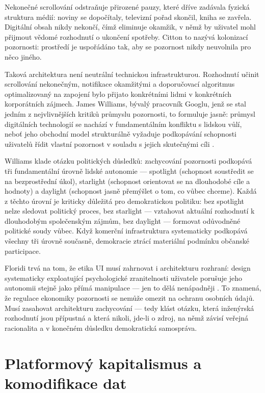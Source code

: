 Nekonečné scrollování odstraňuje přirozené pauzy, které dříve zadávala fyzická struktura médií: noviny se dopočítaly, televizní pořad skončil, kniha se zavřela. Digitální obsah nikdy nekončí, čímž eliminuje okamžik, v němž by uživatel mohl přijmout vědomé rozhodnutí o ukončení spotřeby. Citton to nazývá kolonizací pozornosti: prostředí je uspořádáno tak, aby se pozornost nikdy neuvolnila pro něco jiného.

Taková architektura není neutrální technickou infrastrukturou. Rozhodnutí učinit scrollování nekonečným, notifikace okamžitými a doporučovací algoritmus optimalizovaný na zapojení bylo přijato konkrétními lidmi v konkrétních korporátních zájmech. James Williams, bývalý pracovník Googlu, jenž se stal jedním z nejvlivnějších kritiků průmyslu pozornosti, to formuluje jasně: průmysl digitálních technologií se nachází v fundamentálním konfliktu s lidskou vůlí, neboť jeho obchodní model strukturálně vyžaduje podkopávání schopnosti uživatelů řídit vlastní pozornost v souladu s jejich skutečnými cíli \parencite{Williams18}.

Williams klade otázku politických důsledků: zachycování pozornosti podkopává tři fundamentální úrovně lidské autonomie — spotlight (schopnost soustředit se na bezprostřední úkol), starlight (schopnost orientovat se na dlouhodobé cíle a hodnoty) a daylight (schopnost jasně přemýšlet o tom, co vůbec chceme).
Každá z těchto úrovní je kriticky důležitá pro demokratickou politiku: bez spotlight nelze sledovat politický proces, bez starlight — vztahovat aktuální rozhodnutí k dlouhodobým společenským zájmům, bez daylight — formovat odůvodněné politické soudy vůbec.
Když komerční infrastruktura systematicky podkopává všechny tři úrovně současně, demokracie ztrácí materiální podmínku občanské participace.

Floridi trvá na tom, že etika UI musí zahrnovat i architekturu rozhraní: design systematicky exploatující psychologické zranitelnosti uživatele porušuje jeho autonomii stejně jako přímá manipulace — jen to dělá nenápadněji \parencite{Floridi23}.
To znamená, že regulace ekonomiky pozornosti se nemůže omezit na ochranu osobních údajů.
Musí zasahovat architekturu zachycování — tedy klást otázku, která inženýrská rozhodnutí jsou přípustná a která nikoli, jde-li o zdroj, na němž závisí veřejná racionalita a v konečném důsledku demokratická samospráva.

\section{Platformový kapitalismus a komodifikace dat}


